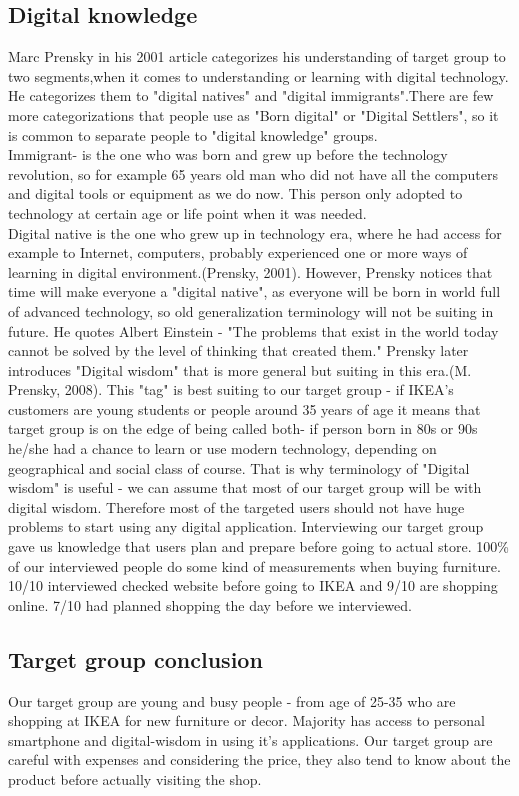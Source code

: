 \subsection{Digital knowledge}
Marc Prensky in his 2001 article categorizes his understanding of target group to two segments,when it comes to understanding or learning with digital technology. He categorizes them to "digital natives" and "digital immigrants".There are few more categorizations that people use as "Born digital" or "Digital Settlers", so it is common to separate people to "digital knowledge" groups.\\
  Immigrant- is the one who was born and grew up before the technology revolution, so for example 65 years old man who did not have all the computers and digital tools or equipment as we do now. This person only adopted to technology at certain age or life point when it was needed.\\
   Digital native is the one who grew up in technology era, where he had access for example to Internet, computers, probably experienced one or more ways of learning in digital environment.(Prensky, 2001). However, Prensky notices that time will make everyone a "digital native", as everyone will be born in world full of advanced technology, so old generalization terminology will not be suiting in future. He quotes Albert Einstein - "The problems that exist in the world today cannot be solved by the level of thinking that created them." Prensky later introduces "Digital wisdom" that is more general but suiting in this era.(M. Prensky, 2008). This "tag" is best suiting to our target group - if IKEA's customers are young students or people around 35 years of age it means that target group is on the edge of being called both- if person born in 80s or 90s he/she had a chance to learn or use modern technology, depending on geographical and social class of course. That is why terminology of "Digital wisdom" is useful - we can assume that most of our target group will be with digital wisdom. Therefore most of the targeted users should not have huge problems to start using any digital application.
Interviewing our target group gave us knowledge that users plan and prepare before going to actual store. 100\% of our interviewed people do some kind of measurements when buying furniture. 10/10 interviewed checked website before going to IKEA and 9/10 are shopping online. 7/10 had planned shopping the day before we interviewed.
\subsection{Target group conclusion}
Our target group are young and busy people - from age of 25-35 who are shopping at IKEA for new furniture or decor. Majority has access to personal smartphone and digital-wisdom in using it’s applications. Our target group are careful with expenses and considering the price, they also tend to know about the product before actually visiting the shop. 


